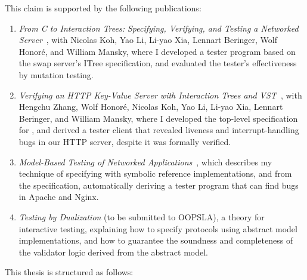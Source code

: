 This claim is supported by the following publications:
\begin{enumerate}
\item {\it From C to Interaction Trees: Specifying, Verifying, and Testing a
  Networked Server}~\cite{cpp19}, with Nicolas Koh, Yao Li, Li-yao Xia, Lennart
  Beringer, Wolf Honor\'e, and William Mansky, where I developed a tester
  program based on the swap server's ITree specification, and evaluated the
  tester's effectiveness by mutation testing.
\item {\it Verifying an HTTP Key-Value Server with Interaction Trees and
  VST}~\cite{itp21}, with Hengchu Zhang, Wolf Honor\'e, Nicolas Koh, Yao Li,
  Li-yao Xia, Lennart Beringer, and William Mansky, where I developed the
  top-level specification for \http, and derived a tester client that revealed
  liveness and interrupt-handling bugs in our HTTP server, despite it was
  formally verified.
\item {\it Model-Based Testing of Networked Applications}~\cite{issta21}, which
  describes my technique of specifying \http with symbolic reference
  implementations, and from the specification, automatically deriving a tester
  program that can find bugs in Apache and Nginx.
\item {\it Testing by Dualization} (to be submitted to OOPSLA), a theory for
  interactive testing, explaining how to specify protocols using abstract model
  implementations, and how to guarantee the soundness and completeness of the
  validator logic derived from the abstract model.
\end{enumerate}

This thesis is structured as follows:
